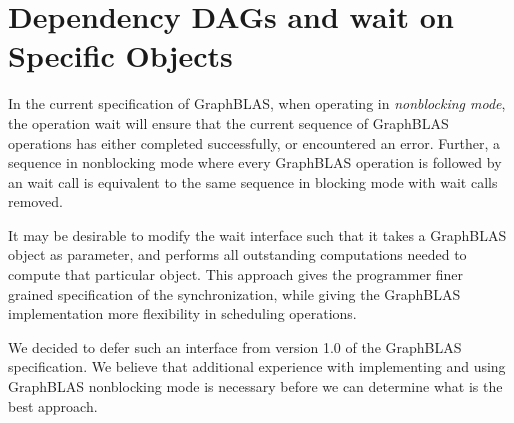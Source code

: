 \section{Dependency DAGs and {\sf wait} on Specific Objects}
\label{Sec:DAG}

In the current specification of GraphBLAS, when operating in \emph{nonblocking
mode}, the operation {\sf wait} will ensure that the current sequence of
GraphBLAS operations has either completed successfully, or encountered an
error. Further, a sequence in nonblocking mode where every GraphBLAS
operation is followed by an {\sf wait} call is equivalent to the same
sequence in blocking mode with {\sf wait} calls removed.

It may be desirable to modify the {\sf wait} interface such that it
takes a GraphBLAS object as parameter, and performs all
outstanding computations needed to compute that particular object.
This approach gives the programmer finer grained specification of the synchronization,
while giving the GraphBLAS implementation more flexibility in scheduling operations.

We decided to defer such an interface from version 1.0 of the GraphBLAS
specification. We believe that additional experience with implementing and
using GraphBLAS nonblocking mode is necessary before we
can determine what is the best approach.

